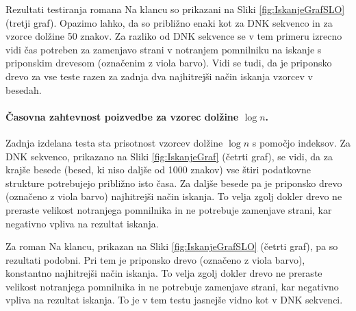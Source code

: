 Rezultati testiranja romana Na klancu so prikazani na Sliki \ref{fig:IskanjeGrafSLO} (tretji graf). Opazimo lahko, da so približno enaki kot za DNK sekvenco in za vzorce dolžine 50 znakov. Za razliko od DNK sekvence se v tem primeru izrecno vidi čas potreben za zamenjavo strani v notranjem pomnilniku na iskanje s priponskim drevesom (označenim z viola barvo). Vidi se tudi, da je priponsko drevo za vse teste razen za zadnja dva najhitrejši način iskanja vzorcev v besedah.

\paragraph{Časovna zahtevnost poizvedbe za vzorec dolžine $\log{n}$.}
Zadnja izdelana testa sta prisotnost vzorcev dolžine $\log{n}$ s pomočjo indeksov. Za DNK sekvenco, prikazano na Sliki \ref{fig:IskanjeGraf} (četrti graf), se vidi, da za krajše besede (besed, ki niso daljše od 1000 znakov) vse štiri podatkovne strukture potrebujejo približno isto časa. Za daljše besede pa je priponsko drevo (označeno z viola barvo) najhitrejši način iskanja. To velja zgolj dokler drevo ne preraste velikost notranjega pomnilnika in ne potrebuje zamenjave strani, kar negativno vpliva na rezultat iskanja.

Za roman Na klancu, prikazan na Sliki \ref{fig:IskanjeGrafSLO} (četrti graf), pa so rezultati podobni. Pri tem je priponsko drevo (označeno z viola barvo), konstantno najhitrejši način iskanja. To velja zgolj dokler drevo ne preraste velikost notranjega pomnilnika in ne potrebuje zamenjave strani, kar negativno vpliva na rezultat iskanja. To je v tem testu jasnejše vidno kot v DNK sekvenci.
